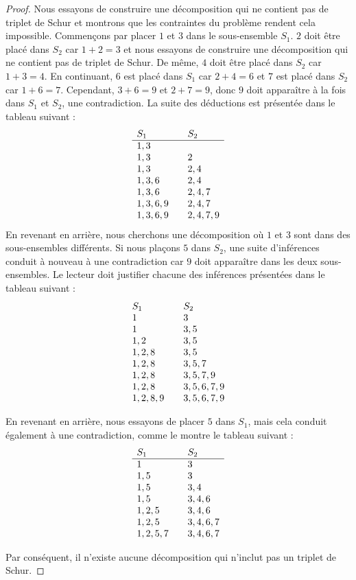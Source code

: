 \begin{proof}
Nous essayons de construire une décomposition qui ne contient pas de triplet de Schur et montrons que les contraintes du problème rendent cela impossible. Commençons par placer $1$ et $3$ dans le sous-ensemble $S_1$. $2$ doit être placé dans $S_2$ car $1+2=3$ et nous essayons de construire une décomposition qui ne contient pas de triplet de Schur. De même, $4$ doit être placé dans $S_2$ car $1+3=4$. En continuant, $6$ est placé dans $S_1$ car $2+4=6$ et $7$ est placé dans $S_2$ car $1+6=7$. Cependant, $3+6=9$ et $2+7=9$, donc $9$ doit apparaître à la fois dans $S_1$ et $S_2$, une contradiction. La suite des déductions est présentée dans le tableau suivant :
\[
\begin{array}{l@{\hspace{2em}}l}
S_1&S_2\\ \hline
1,3 & \\
1,3 & 2\\
1,3 & 2,4\\
1,3,6 & 2,4\\
1,3,6 & 2,4,7\\
1,3,6,9 & 2,4,7\\
1,3,6,9 & 2,4,7,9
\end{array}
\]
En revenant en arrière, nous cherchons une décomposition où $1$ et 3 sont dans des sous-ensembles différents. Si nous plaçons $5$ dans $S_2$, une suite d'inférences conduit à nouveau à une contradiction car $9$ doit apparaître dans les deux sous-ensembles. Le lecteur doit justifier chacune des inférences présentées dans le tableau suivant :
\[
\begin{array}{l@{\hspace{2em}}l}
S_1&S_2\\
1&3\\
1 & 3,5\\
1,2&3,5\\
1,2,8&3,5\\
1,2,8&3,5,7\\
1,2,8&3,5,7,9\\
1,2,8&3,5,6,7,9\\
1,2,8,9&3,5,6,7,9
\end{array}
\]


En revenant en arrière, nous essayons de placer $5$ dans $S_1$, mais cela conduit également à une contradiction, comme le montre le tableau suivant :
\[
\begin{array}{l@{\hspace{2em}}l}
S_1&S_2\\\hline
1&3\\
1,5& 3\\
1,5&3,4\\
1,5&3,4,6\\
1,2,5&3,4,6\\
1,2,5&3,4,6,7\\
1,2,5,7&3,4,6,7
\end{array}
\]

Par conséquent, il n'existe aucune décomposition qui n'inclut pas un triplet de Schur.
\end{proof}
